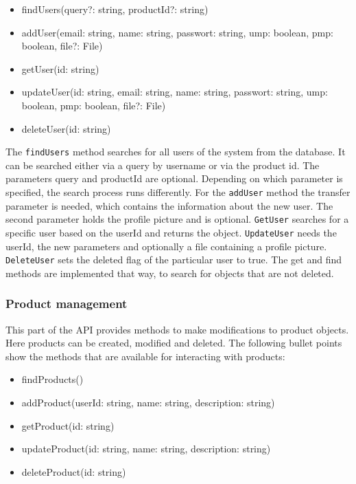     \begin{itemize} 
        \item findUsers(query?: string, productId?: string) 
        \item addUser(email: string, name: string, passwort: string, ump: boolean, pmp: boolean, file?: File)
        \item getUser(id: string)
        \item updateUser(id: string, email: string, name: string, passwort: string, ump: boolean, pmp: boolean, file?: File)
        \item deleteUser(id: string)
    \end{itemize}

    The \texttt{findUsers} method searches for all users of the system from the database. It can be searched either via a query by username or via the product id. The parameters query and productId are optional. Depending on which parameter is specified, the search process runs differently. For the \texttt{addUser} method the transfer parameter is needed, which contains the information about the new user. The second parameter holds the profile picture and is optional. \texttt{GetUser} searches for a specific user based on the userId and returns the object. \texttt{UpdateUser} needs the userId, the new parameters and optionally a file containing a profile picture. \texttt{DeleteUser} sets the deleted flag of the particular user to true. The get and find methods are implemented that way, to search for objects that are not deleted.

    \subsubsection*{Product management}
    This part of the API provides methods to make modifications to product objects. Here products can be created, modified and deleted. The following bullet points show the methods that are available for interacting with products:

    \begin{itemize}
        \item findProducts()
        \item addProduct(userId: string, name: string, description: string)
        \item getProduct(id: string)
        \item updateProduct(id: string, name: string, description: string)
        \item deleteProduct(id: string)
    \end{itemize}

